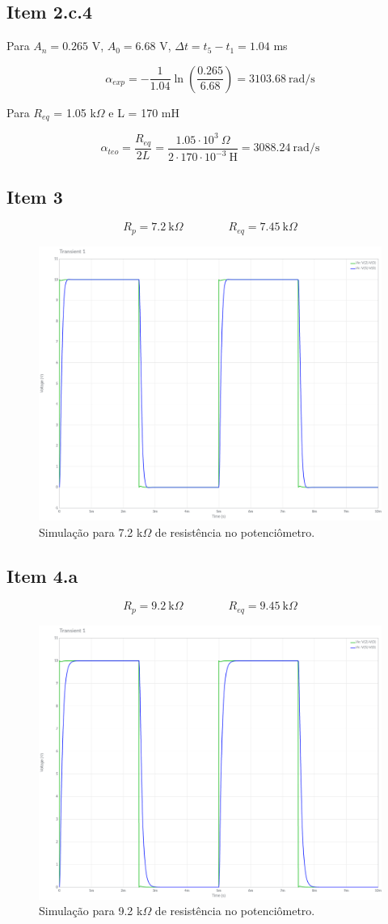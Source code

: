 \documentclass[11pt]{article}
\begin{document}
\subsection*{Item 2.c.4}

Para $A_n = 0.265$ V, $A_0 = 6.68$ V, $\Delta t = t_5 - t_1 = 1.04$ ms

$$
  \alpha_{exp} = - \frac{1}{1.04} \ln \left(\frac{0.265}{6.68}\right) = 3103.68\ \text{rad/s}
$$

Para $R_{eq}$ = 1.05 k$\Omega$ e L = 170 mH

$$
  \alpha_{teo} = \frac{R_{eq}}{2L} = \frac{1.05 \cdot 10^3\ \Omega}{2 \cdot 170 \cdot 10^{-3}\ \text{H}} = 3088.24\ \text{rad/s}
$$

\subsection*{Item 3}

$$
  R_p = 7.2\ \text{k}\Omega \qquad \qquad R_{eq} = 7.45\ \text{k}\Omega
$$

\begin{figure}[h!]
  \centering
  \includegraphics[width=.6\textwidth]{fig/3}
  \caption{Simulação para 7.2 k$\Omega$ de resistência no potenciômetro.}
  \label{fig:3}
\end{figure}

\subsection*{Item 4.a}

$$
  R_p = 9.2\ \text{k}\Omega \qquad \qquad R_{eq} = 9.45\ \text{k}\Omega
$$

\begin{figure}[h!]
  \centering
  \includegraphics[width=.6\textwidth]{fig/4a}
  \caption{Simulação para 9.2 k$\Omega$ de resistência no potenciômetro.}
  \label{fig:3}
\end{figure}
\end{document}
